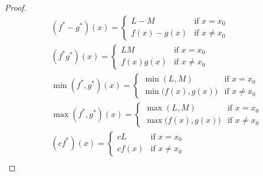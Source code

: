 \begin{proof}
\begin{align*}
                                      & (f^* - g^*)(x) = \begin{cases}
                                                             L - M       & \text{if } x = x_0    \\
                                                             f(x) - g(x) & \text{if } x \neq x_0
                                                         \end{cases}                    \\
                                      & (f^* g^*)(x) = \begin{cases}
                                                           LM        & \text{if } x = x_0    \\
                                                           f(x) g(x) & \text{if } x \neq x_0
                                                       \end{cases}                        \\
                                      & \min(f^*, g^*)(x) = \begin{cases}
                                                                \min(L, M)               & \text{if } x = x_0    \\
                                                                \min\big(f(x), g(x)\big) & \text{if } x \neq x_0
                                                            \end{cases}    \\
                                      & \max(f^*, g^*)(x) = \begin{cases}
                                                                \max(L, M)               & \text{if } x = x_0    \\
                                                                \max\big(f(x), g(x)\big) & \text{if } x \neq x_0
                                                            \end{cases}    \\
                                      & (c f^*)(x) = \begin{cases}
                                                         cL     & \text{if } x = x_0    \\
                                                         c f(x) & \text{if } x \neq x_0
                                                     \end{cases}                             \\

\end{align*}
\end{proof}
